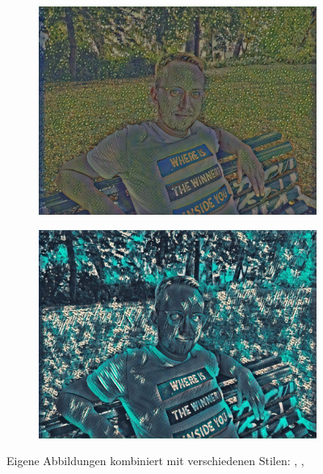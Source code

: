 \begin{figure}[H]
\begin{subfigure}[h]{0.24\textwidth}
        \includegraphics[width=\textwidth]{resources/content/experiments/ich-vgg16_portrait_of_joseph_roulin.jpg}
    \end{subfigure}
    \begin{subfigure}[h]{0.24\textwidth}
        \centering
        \includegraphics[width=\textwidth]{resources/content/experiments/ich-vgg16_teal_and_black_abstract_painting.jpg}
    \end{subfigure}

    \caption{Eigene Abbildungen kombiniert mit verschiedenen Stilen: \cite{crystal_glass_on_a_colorful_background_img}, \cite{portrait_of_joseph_roulin_img}, \cite{teal_and_black_abstract_painting_img}}
    \label{img:trained_models1}
\end{figure}

